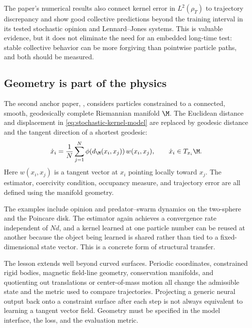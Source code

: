 The paper's numerical results also connect kernel error in \(L^2(\rho_T)\) to trajectory discrepancy and show good collective predictions beyond the training interval in its tested stochastic opinion and Lennard--Jones systems. This is valuable evidence, but it does not eliminate the need for an embedded long-time test: stable collective behavior can be more forgiving than pointwise particle paths, and both should be measured.

\subsection{Geometry is part of the physics}

The second anchor paper, \citet{maggioni2021manifold}, considers particles constrained to a connected, smooth, geodesically complete Riemannian manifold \(\M\). The Euclidean distance and displacement in \cref{eq:stochastic-kernel-model} are replaced by geodesic distance and the tangent direction of a shortest geodesic:
\begin{equation}
\dot x_i
=
\frac{1}{N}\sum_{j=1}^{N}
\phi\!\left(d_{\M}(x_i,x_j)\right)
w(x_i,x_j),
\qquad
\dot x_i\in T_{x_i}\M .
\label{eq:manifold-kernel}
\end{equation}
Here \(w(x_i,x_j)\) is a tangent vector at \(x_i\) pointing locally toward \(x_j\). The estimator, coercivity condition, occupancy measure, and trajectory error are all defined using the manifold geometry.

The examples include opinion and predator--swarm dynamics on the two-sphere and the Poincare disk. The estimator again achieves a convergence rate independent of \(Nd\), and a kernel learned at one particle number can be reused at another because the object being learned is shared rather than tied to a fixed-dimensional state vector. This is a concrete form of structural transfer.

The lesson extends well beyond curved surfaces. Periodic coordinates, constrained rigid bodies, magnetic field-line geometry, conservation manifolds, and quotienting out translations or center-of-mass motion all change the admissible state and the metric used to compare trajectories. Projecting a generic neural output back onto a constraint surface after each step is not always equivalent to learning a tangent vector field. Geometry must be specified in the model interface, the loss, and the evaluation metric.


